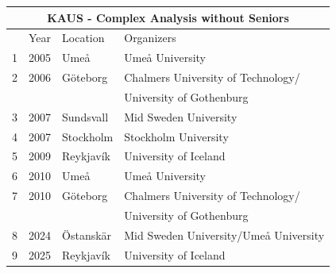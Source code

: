 \documentclass[12pt, openany, twoside]{report}      %
\begin{document}
\begin{center}
    \begin{tabular}{llll}
        \toprule
        \multicolumn{4}{c}{KAUS - Complex Analysis without Seniors}\\
        \midrule
         & Year & Location & Organizers \\
         \midrule
        1 & 2005 & Umeå & Umeå University\\
        2 & 2006 & Göteborg  & Chalmers University of Technology/\\
          &      &               & University of Gothenburg \\
        3 & 2007 & Sundsvall & Mid Sweden University\\
        4 & 2007 & Stockholm & Stockholm University  \\
        5 & 2009 & Reykjavík & University of Iceland\\
        6 & 2010 & Umeå & Umeå University\\
        7 & 2010 & Göteborg & Chalmers University of Technology/\\
           &      &               & University of Gothenburg\\
        8 & 2024 & Östanskär & Mid Sweden University/Umeå University\\
        9 & 2025 & Reykjavík & University of Iceland\\
        \bottomrule
    \end{tabular}
\end{center}
\end{document}
